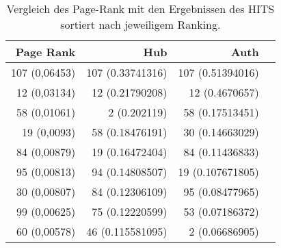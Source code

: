 \begin{frame}[c]
\begin{table}
\begin{tabular}{r|r|r|r}
\textbf{Page Rank} & \textbf{Hub} & \textbf{Auth} \\
\hline
107 (0,06453) & 107 (0.33741316) & 107 (0.51394016) \\
12 (0,03134)  & 12 (0.21790208)  & 12 (0.4670657) \\
58 (0,01061)  & 2 (0.202119)     & 58 (0.17513451) \\
19 (0,0093)   & 58 (0.18476191)  & 30 (0.14663029) \\
84 (0,00879)  & 19 (0.16472404)  & 84 (0.11436833) \\
95 (0,00813)  & 94 (0.14808507)  & 19 (0.107671805) \\
30 (0,00807)  & 84 (0.12306109)  & 95 (0.08477965) \\
99 (0,00625)  & 75 (0.12220599)  & 53 (0.07186372) \\
60 (0,00578)  & 46 (0.115581095) & 2 (0.06686905) \\
\end{tabular}
\caption{Vergleich des Page-Rank mit den Ergebnissen des HITS sortiert nach jeweiligem Ranking.}
\label{tbl:pr_vs_hits}
\end{table}

\end{frame}
